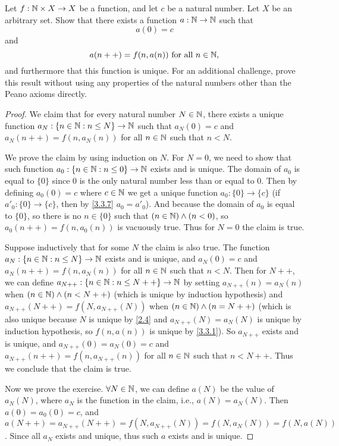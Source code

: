 \begin{ex}\label{ex:3.5.12}
  Let \(f : \mathbb{N} \times X \to X\) be a function, and let \(c\) be a natural number.
  Let \(X\) be an arbitrary set.
  Show that there exists a function \(a : \mathbb{N} \to \mathbb{N}\) such that
  \[
    a(0) = c
  \]
  and
  \[
    a(n++) = f(n, a(n)) \text{ for all } n \in \mathbb{N},
  \]
  and furthermore that this function is unique.
  For an additional challenge, prove this result without using any properties of the natural numbers other than the Peano axioms directly.
\end{ex}

\begin{proof}
  We claim that for every natural number \(N \in \mathbb{N}\), there exists a unique function \(a_N : \{n \in \mathbb{N} : n \leq N\} \to \mathbb{N}\) such that \(a_N(0) = c\) and \(a_N(n++) = f(n, a_{N}(n))\) for all \(n \in \mathbb{N}\) such that \(n < N\).

  We prove the claim by using induction on \(N\).
  For \(N = 0\), we need to show that such function \(a_0 : \{n \in \mathbb{N} : n \leq 0\} \to \mathbb{N}\) exists and is unique.
  The domain of \(a_0\) is equal to \(\{0\}\) since \(0\) is the only natural number less than or equal to \(0\).
  Then by defining \(a_0(0) = c\) where \(c \in \mathbb{N}\) we get a unique function \(a_0 : \{0\} \to \{c\}\) (if \(a'_0 : \{0\} \to \{c\}\), then by \cref{3.3.7} \(a_0 = a'_0\)).
  And because the domain of \(a_0\) is equal to \(\{0\}\), so there is no \(n \in \{0\}\) such that \((n \in \mathbb{N}) \land (n < 0)\), so \(a_0(n++) = f(n, a_0(n))\) is vacuously true.
  Thus for \(N = 0\) the claim is true.

  Suppose inductively that for some \(N\) the claim is also true.
  The function \(a_N : \{n \in \mathbb{N} : n \leq N\} \to \mathbb{N}\) exists and is unique, and \(a_N(0) = c\) and \(a_N(n++) = f(n, a_N(n))\) for all \(n \in \mathbb{N}\) such that \(n < N\).
  Then for \(N++\), we can define \(a_{N++} : \{n \in \mathbb{N} : n \leq N++\} \to \mathbb{N}\) by setting \(a_{N++}(n) = a_N(n)\) when \((n \in \mathbb{N}) \land (n < N++)\) (which is unique by induction hypothesis) and \(a_{N++}(N++) = f(N, a_{N++}(N))\) when \((n \in \mathbb{N}) \land (n = N++)\) (which is also unique because \(N\) is unique by \cref{2.4} and \(a_{N++}(N) = a_N(N)\) is unique by induction hypothesis, so \(f(n, a(n))\) is unique by \cref{3.3.1}).
  So \(a_{N++}\) exists and is unique, and \(a_{N++}(0) = a_N(0) = c\) and \(a_{N++}(n++) = f(n, a_{N++}(n))\) for all \(n \in \mathbb{N}\) such that \(n < N++\).
  Thus we conclude that the claim is true.

  Now we prove the exercise.
  \(\forall N \in \mathbb{N}\), we can define \(a(N)\) be the value of \(a_N(N)\), where \(a_N\) is the function in the claim, i.e., \(a(N) = a_{N}(N)\).
  Then \(a(0) = a_0(0) = c\), and \(a(N++) = a_{N++}(N++) = f(N, a_{N++}(N)) = f(N, a_{N}(N)) = f(N, a(N))\).
  Since all \(a_N\) exists and unique, thus such \(a\) exists and is unique.


\end{proof}
